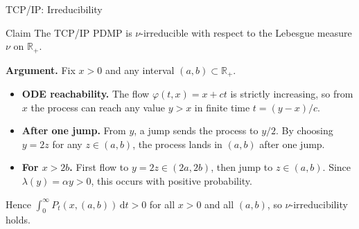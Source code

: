 \documentclass[aspectratio=169]{beamer}
\begin{document}
\begin{frame}{TCP/IP: Irreducibility}

  \begin{block}{Claim}
    The TCP/IP PDMP is $\nu$-irreducible with respect to the
    Lebesgue measure $\nu$ on $\mathbb{R}_+$.
  \end{block}

  \bigskip
  \textbf{Argument.} Fix $x > 0$ and any interval $(a,b) \subset
  \mathbb{R}_+$.

  \begin{itemize}
    \setlength\itemsep{6pt}
    \item \textbf{ODE reachability.} The flow $\varphi(t,x) = x + ct$
          is strictly increasing, so from $x$ the process can reach
          any value $y > x$ in finite time $t = (y-x)/c$.
    \item \textbf{After one jump.} From $y$, a jump sends the process
          to $y/2$. By choosing $y = 2z$ for any $z \in (a,b)$, the
          process lands in $(a,b)$ after one jump.
    \item \textbf{For $x > 2b$.} First flow to $y = 2z \in (2a,2b)$,
          then jump to $z \in (a,b)$. Since $\lambda(y) = \alpha y > 0$,
          this occurs with positive probability.
  \end{itemize}

  \bigskip
  Hence $\int_0^\infty P_t(x,(a,b))\,\mathrm{d}t > 0$ for all
  $x > 0$ and all $(a,b)$, so $\nu$-irreducibility holds.

\end{frame}
\end{document}
